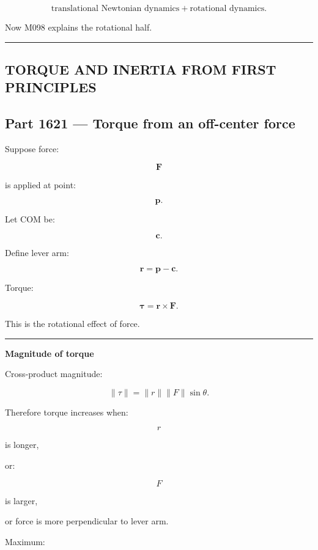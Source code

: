 \[
\boxed{
\text{translational Newtonian dynamics}
+
\text{rotational dynamics}.
}
\]

Now M098 explains the rotational half.

\begin{center}\rule{0.5\linewidth}{0.5pt}\end{center}

\subsection{TORQUE AND INERTIA FROM FIRST PRINCIPLES}\label{06-engine-ii-ch035-torque-and-inertia-from-first-principles}

\subsection{Part 1621 --- Torque from an off-center force}\label{06-engine-ii-ch035-part-1621-torque-from-an-off-center-force}

Suppose force:

\[
\mathbf{F}
\]

is applied at point:

\[
\mathbf{p}.
\]

Let COM be:

\[
\mathbf{c}.
\]

Define lever arm:

\[
\boxed{
\mathbf{r}
=
\mathbf{p}-\mathbf{c}.
}
\]

Torque:

\[
\boxed{
\boldsymbol{\tau}
=
\mathbf{r}\times\mathbf{F}.
}
\]

This is the rotational effect of force.

\begin{center}\rule{0.5\linewidth}{0.5pt}\end{center}

\textbf{Magnitude of torque}

Cross-product magnitude:

\[
\|\tau\|
=
\|r\|\|F\|\sin\theta.
\]

Therefore torque increases when:

\[
r
\]

is longer,

or:

\[
F
\]

is larger,

or force is more perpendicular to lever arm.

Maximum:

